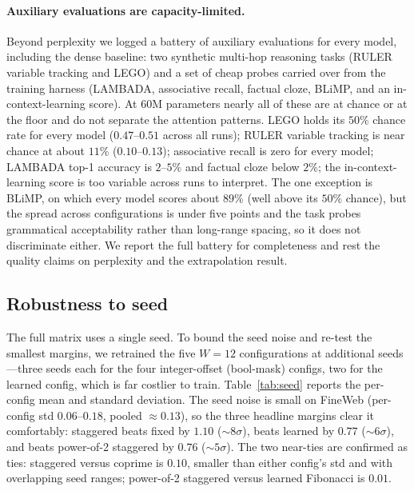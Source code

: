 \documentclass[11pt]{article}
\begin{document}
\paragraph{Auxiliary evaluations are capacity-limited.}
Beyond perplexity we logged a battery of auxiliary evaluations for every model,
including the dense baseline: two synthetic multi-hop reasoning tasks (RULER
variable tracking and LEGO) and a set of cheap probes carried over from the
training harness (LAMBADA, associative recall, factual cloze, BLiMP, and an
in-context-learning score). At 60M parameters nearly all of these are at chance or
at the floor and do not separate the attention patterns. LEGO holds its $50\%$
chance rate for every model ($0.47$--$0.51$ across all runs); RULER variable
tracking is near chance at about $11\%$ ($0.10$--$0.13$); associative recall is
zero for every model; LAMBADA top-1 accuracy is $2$--$5\%$ and factual cloze below
$2\%$; the in-context-learning score is too variable across runs to interpret. The
one exception is BLiMP, on which every model scores about $89\%$ (well above its
$50\%$ chance), but the spread across configurations is under five points and the
task probes grammatical acceptability rather than long-range spacing, so it does
not discriminate either. We report the full battery for completeness and rest the
quality claims on perplexity and the extrapolation result.

\subsection{Robustness to seed}
\label{sec:seed}

The full matrix uses a single seed. To bound the seed noise and re-test the
smallest margins, we retrained the five $W{=}12$ configurations at additional
seeds---three seeds each for the four integer-offset (bool-mask) configs, two for
the learned config, which is far costlier to train. Table~\ref{tab:seed} reports
the per-config mean and standard deviation. The seed noise is small on FineWeb
(per-config std $0.06$--$0.18$, pooled $\approx 0.13$), so the three headline
margins clear it comfortably: staggered beats fixed by $1.10$ ($\sim 8\sigma$),
beats learned by $0.77$ ($\sim 6\sigma$), and beats power-of-2 staggered by
$0.76$ ($\sim 5\sigma$). The two near-ties are confirmed as ties: staggered
versus coprime is $0.10$, smaller than either config's std and with overlapping
seed ranges; power-of-2 staggered versus learned Fibonacci is $0.01$.
\end{document}
